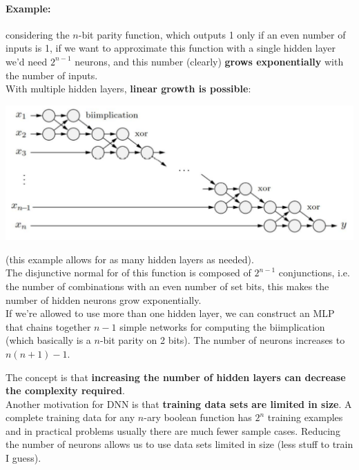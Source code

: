 \paragraph{Example:} considering the $n$-bit parity function, which outputs 1 only if an even number of inputs is 1, if we want to approximate this function with a single hidden layer we'd need $2^{n-1}$ neurons, and this number (clearly) \textbf{grows exponentially} with the number of inputs. \\

With multiple hidden layers, \textbf{linear growth is possible}:
\begin{center}
	\includegraphics[width=0.95\columnwidth]{img/NN/nbitparity1}
\end{center}
(this example allows for as many hidden layers as needed).\\
The disjunctive normal for of this function is composed of $2^{n-1}$ conjunctions, i.e. the number of combinations with an even number of set bits, this makes the number of hidden neurons grow exponentially.\\
If we're allowed to use more than one hidden layer, we can construct an MLP that chains together $n-1$ simple networks for computing the biimplication (which basically is a $n$-bit parity on 2 bits). The number of neurons increases to $n(n+1)-1$.

\newpage

The concept is that \textbf{increasing the number of hidden layers can decrease the complexity required}.\\

Another motivation for DNN is that \textbf{training data sets are limited in size}. A complete training data for any $n$-ary boolean function has $2^n$ training examples and in practical problems usually there are much fewer sample cases. Reducing the number of neurons allows us to use data sets limited in size (less stuff to train I guess).\\

